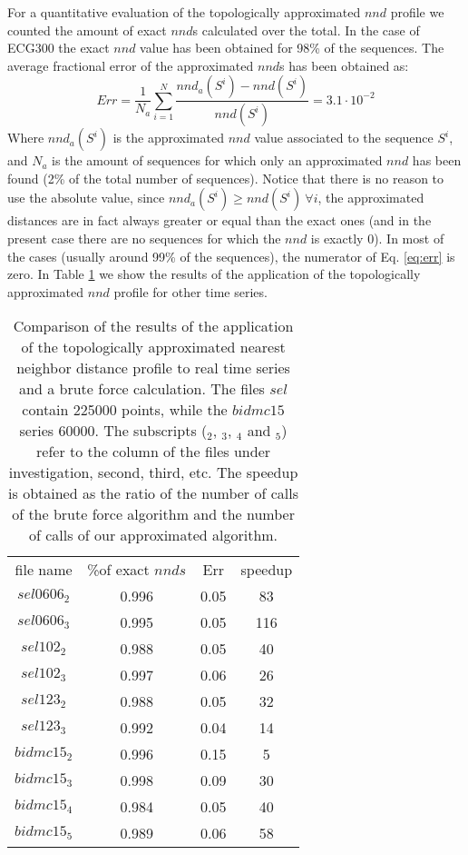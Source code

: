 \documentclass[a4paper,twoside]{article}
\begin{document}
For a quantitative evaluation of the topologically approximated $nnd$ profile we counted the amount of exact $nnd$s calculated over the total. In the case of ECG300 the exact $nnd$ value has been obtained for 98\% of the sequences. The average fractional error of the approximated $nnd$s has been obtained as:
\begin{equation}\label{eq:err}
Err= \frac{1}{N_a}\sum_{i=1}^{N}  \frac{ nnd_a(S^{i})  - nnd(S^{i})} {nnd(S^{i})} =   3.1\cdot 10^{-2}
\end{equation}
Where  $nnd_a(S^i)$ is the approximated $nnd$ value associated to the sequence $S^i$, and $N_a$ is the amount of sequences for which only an approximated $nnd$ has been found (2\% of the total number of sequences). Notice that there is no reason to use the absolute value, since $nnd_a(S^i) \geq nnd(S^i) ~\forall i$, the approximated distances are in fact always greater or equal than the exact ones (and in the present case there are no sequences for which the $nnd$ is exactly $0$). In most of the cases (usually around 99\% of the sequences), the numerator of Eq. \ref{eq:err} is zero. In Table \ref{tab:validation} we show the results of the application of the topologically approximated $nnd$ profile for other time series. 


\begin{table}
 \begin{tabular}{cccc}
file name &  \%of exact $nnds$  &        Err  &   speedup \\
$sel0606_2$    &  0.996   &  0.05          &    83  \\
$sel0606_3$    &  0.995   &  0.05          &   116  \\
$sel102_2$     &  0.988   &  0.05          &    40  \\
$sel102_3$     &  0.997   &  0.06          &    26  \\
$sel123_2$     &  0.988   &  0.05          &    32  \\
$sel123_3$     &  0.992   &  0.04          &    14  \\
$bidmc15_2 $     &  0.996   &  0.15          &     5  \\
$bidmc15_3 $     &  0.998   &  0.09          &    30  \\ 
$bidmc15_4 $     &  0.984   &  0.05          &    40  \\ 
$bidmc15_5 $     &  0.989   &  0.06          &    58  \\ 
 \end{tabular}
 \caption{Comparison of the results of the application of the topologically approximated nearest neighbor distance profile to real time series \cite{physio} and a brute force calculation.
 The files $sel$ contain 225000 points, while the $bidmc15$ series 60000. The subscripts ($_2$, $_3$, $_4$ and $_5$) refer to the column of the files under investigation, second, third, etc.
 The speedup is obtained as the ratio of the number of calls of  the brute force algorithm and the number of calls of our approximated algorithm.}
 \label{tab:validation}
\end{table}
\end{document}
